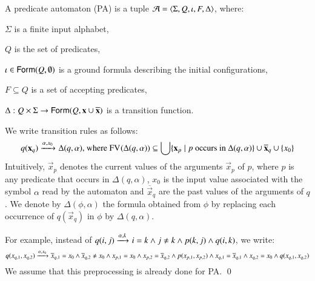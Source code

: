 \documentclass{llncs}
\begin{document}
\begin{definition}
  A predicate automaton (PA) is a tuple $\mathcal{A} =
  \left\langle \Sigma,Q,\iota,F,\Delta \right\rangle$, where: \begin{compactitem}
  \item $\Sigma$ is a finite input alphabet,
  \item $Q$ is the set of predicates,
  \item $\iota \in \mathsf{Form}(Q,\emptyset)$ is a ground formula describing
    the initial configurations,
  \item $F \subseteq Q$ is a set of accepting predicates,
  \item $\Delta : Q \times \Sigma \rightarrow
    \mathsf{Form}(Q,\mathbf x\cup\overline{\mathbf x})$ is a transition function.
  \end{compactitem}
\end{definition}
We write transition rules as follows: 
\[q(\mathbf x_q) \xrightarrow{{\scriptstyle \alpha,x_0}}_{{\scriptstyle }} \Delta(q,\alpha) 
\text{, where $\mathrm{FV}^{}(\Delta(q,\alpha)) \subseteq \bigcup \{\mathbf x_p
  \mid p \text{ occurs in } \Delta(q,\alpha)\} \cup
  \overline{\mathbf x}_q \cup \left\{ x_0 \right\}$}\] Intuitively, $\vec{x}_p$
denotes the current values of the arguments $\vec{x}_p$ of $p$, where
$p$ is any predicate that occurs in $\Delta(q,\alpha)$, $x_0$ is the
input value associated with the symbol $\alpha$ read by the automaton
and $\overline{\vec{x}}_q$ are the past values of the arguments of
$q$. We denote by $\Delta(\phi,\alpha)$ the formula obtained from
$\phi$ by replacing each occurrence of $q(\vec{x}_q)$ in $\phi$ by
$\Delta(q,\alpha)$.

\begin{example}
For example, instead of \(q(i,j) \xrightarrow{{\scriptstyle \alpha,k}}_{{\scriptstyle }} i = k \wedge j
\neq k \wedge p(k,j) \wedge q(i,k)\), we write: \[q(x_{q,1},x_{q,2})
\xrightarrow{{\scriptstyle \alpha,x_0}}_{{\scriptstyle }} \overline{x}_{q,1} = x_0 \wedge
\overline{x}_{q,2} \neq x_0 \wedge x_{p,1} = x_0 \wedge x_{p,2} =
\overline{x}_{q,2} \wedge p(x_{p,1},x_{p,2}) \wedge x_{q,1} =
\overline{x}_{q,1} \wedge x_{q,2} = x_0 \wedge q(x_{q,1},x_{q,2})\] We
assume that this preprocessing is already done for PA. \hfill\qed
\end{example}
\end{document}
